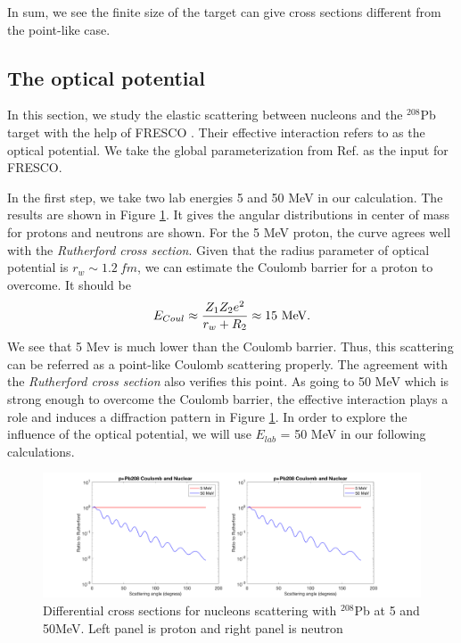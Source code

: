 \documentclass[12pt]{article}
\begin{document}
  		In sum, we see the finite size of the target can give cross sections different from the point-like case.
\subsection{The optical potential}
	In this section, we study the elastic scattering between nucleons and the $^{208}$Pb target with the help of FRESCO\cite{FRESCO} . Their effective interaction refers to as the optical potential. We take the global parameterization from Ref. \cite{capote2009ripl,koning2003local} as the input for FRESCO.
	
	In the first step, we take two lab energies 5 and 50 MeV in our calculation. The results are shown in Figure \ref{fig:angulardistribution}. It gives the angular distributions in center of mass for protons and neutrons are shown. For the 5 MeV proton, the curve agrees well with the \emph{Rutherford cross section}. Given that the radius parameter of optical potential is $r_w\sim1.2\ fm$, we can estimate the Coulomb barrier for a proton to overcome. It should be 
	\begin{equation}
	E_{Coul}\approx\frac{Z_1Z_2e^2}{r_w+R_2}\approx15\ \rm{MeV}.
	\end{equation}
	We see that 5 Mev is much lower than the Coulomb barrier. Thus, this scattering can be referred as a point-like Coulomb scattering properly. The agreement with the \emph{Rutherford cross section} also verifies this point.
	As going to 50 MeV which is strong enough to overcome the Coulomb barrier, the effective interaction plays a role and induces a diffraction pattern in Figure \ref{fig:angulardistribution}. In order to explore the influence of the optical potential, we will use $E_{lab}$ = 50 MeV in our following calculations.
	
	\begin{figure}[t]
	\centering
	\includegraphics[width=1.0\textwidth]{5.png}
	\caption{Differential cross sections for nucleons scattering with $^{208}$Pb at 5 and 50MeV. Left panel is proton and right panel is neutron  }
	\label{fig:angulardistribution}
	\end{figure}
	
\end{document}
